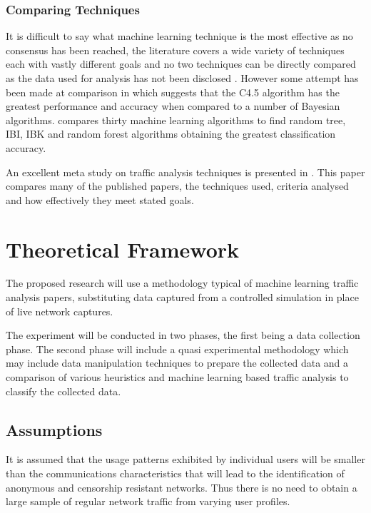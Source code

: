 \documentclass{conference}
\begin{document}
\subsubsection{Comparing Techniques}

It is difficult to say what machine learning technique is the most effective as no consensus has been reached, the literature covers a wide variety of techniques each with vastly different goals and no two techniques can be directly compared as the data used for analysis has not been disclosed \citep{Kim:2007p3867}. However some attempt has been made at comparison in \cite{Williams:2006p3849} which suggests that the C4.5 algorithm has the greatest performance and accuracy when compared to a number of Bayesian algorithms. \cite{Mohd:2009p6484} compares thirty machine learning algorithms  to find random tree, IBI, IBK and random forest algorithms obtaining the greatest classification accuracy.

An excellent meta study on traffic analysis techniques is presented in \cite{Nguyen:2008p3837}. This paper compares many of the published papers, the techniques used, criteria analysed and how effectively they meet stated goals.

\section{Theoretical Framework}

The proposed research will use a methodology typical of machine learning traffic analysis papers, substituting data captured from a controlled simulation in place of live network captures. 

The experiment will be conducted in two phases, the first being a data collection phase. The second phase will include a quasi experimental methodology which may include data manipulation techniques to prepare the collected data and a comparison of various heuristics and machine learning based traffic analysis to classify the collected data.

\subsection{Assumptions}

It is assumed that the usage patterns exhibited by individual users will be smaller than the communications characteristics that will lead to the identification of anonymous and censorship resistant networks. Thus there is no need to obtain a large sample of regular network traffic from varying user profiles.
\end{document}
